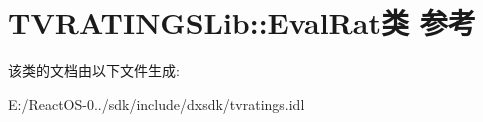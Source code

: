 \hypertarget{class_t_v_r_a_t_i_n_g_s_lib_1_1_eval_rat}{}\section{T\+V\+R\+A\+T\+I\+N\+G\+S\+Lib\+:\+:Eval\+Rat类 参考}
\label{class_t_v_r_a_t_i_n_g_s_lib_1_1_eval_rat}


该类的文档由以下文件生成\+:\begin{DoxyCompactItemize}
\item 
E\+:/\+React\+O\+S-\/0../sdk/include/dxsdk/tvratings.\+idl\end{DoxyCompactItemize}
